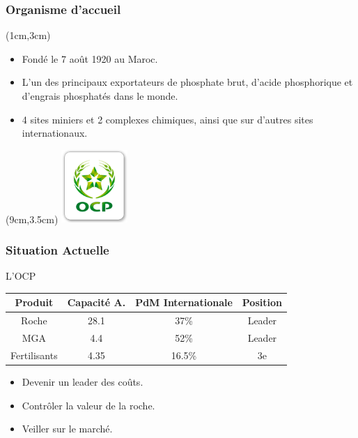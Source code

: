 \documentclass{beamer}
\begin{document}
\begin{frame}
	\frametitle{Organisme d’accueil}
	\begin{textblock*}{7cm}(1cm,3cm)
		\begin{itemize}
			\item Fondé le 7 août 1920 au Maroc.
			\item L'un des principaux exportateurs de phosphate brut, d’acide phosphorique et d’engrais phosphatés dans le monde.
			\item 4 sites miniers et 2 complexes chimiques, ainsi que sur d'autres sites internationaux.
		\end{itemize}
	\end{textblock*}
	
	\begin{textblock*}{5cm}(9cm,3.5cm) %
		\includegraphics[width=2.5cm]{logo-ocp}
	\end{textblock*}
\end{frame}

\begin{frame}
\frametitle{Situation Actuelle}
\begin{block}{L'OCP}
\begin{table}
\centering 
  \begin{tabular}{|c|c|c|c|}
  \hline
  \small{Produit} & \small{Capacité A.} & \small{PdM Internationale} & \small{Position} \\
  \hline
  Roche & 28.1 & 37\% & Leader\\
  MGA & 4.4 & 52\% & Leader\\
  Fertilisants & 4.35 & 16.5\% & 3e\\
  \hline
  \end{tabular}
  \end{table}
  \begin{itemize}
  \item Devenir un leader des coûts.
  \item	Contrôler la valeur de la roche.
  \item Veiller sur le marché.
  \end{itemize}
  \end{block} 
\end{frame}
\end{document}
